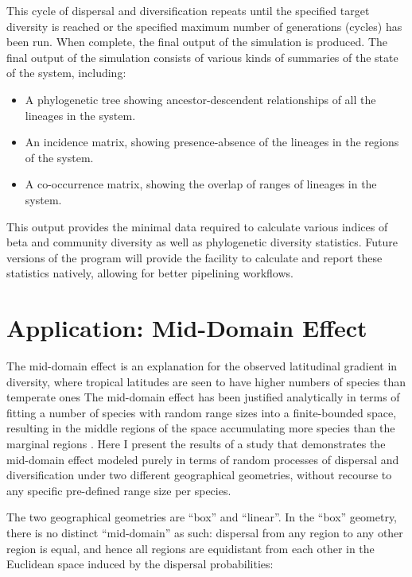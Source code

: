 \documentclass[11pt]{article}
\begin{document}
This cycle of dispersal and diversification repeats until the specified target diversity is reached or the specified maximum number of generations (cycles) has been run.
When complete, the final output of the simulation is produced.
The final output of the simulation consists of various kinds of summaries of the state of the system, including:

\begin{itemize}
	\item A phylogenetic tree showing ancestor-descendent relationships of all the lineages in the system.
	\item An incidence matrix, showing presence-absence of the lineages in the regions of the system.
	\item A co-occurrence matrix, showing the overlap of ranges of lineages in the system.
\end{itemize}

This output provides the minimal data required to calculate various indices of beta and community diversity as well as phylogenetic diversity statistics.
Future versions of the program will provide the facility to calculate and report these statistics natively, allowing for better pipelining workflows.

\section*{Application: Mid-Domain Effect}
The mid-domain effect is an explanation for the observed latitudinal gradient in diversity, where tropical latitudes are seen to have higher numbers of species than temperate ones \citep{Colwell2004a, Colwella,Connolly2005a}
The mid-domain effect has been justified analytically in terms of fitting a number of species with random range sizes into a finite-bounded space, resulting in the middle regions of the space accumulating more species than the marginal regions \citep{Colwell2004a}.
Here I present the results of a study that demonstrates the mid-domain effect modeled purely in terms of random processes of dispersal and diversification under two different geographical geometries, without recourse to any specific pre-defined range size per species.

The two geographical geometries are ``box'' and ``linear''.
In the ``box'' geometry, there is no distinct ``mid-domain'' as such: dispersal from any region to any other region is equal, and hence all regions are equidistant from each other in the Euclidean space induced by the dispersal probabilities:
\end{document}
